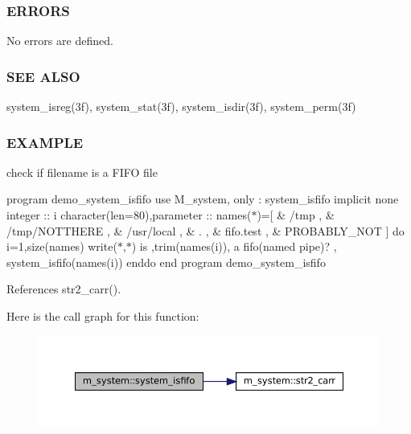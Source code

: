 \subsubsection*{E\+R\+R\+O\+RS}

No errors are defined.

\subsubsection*{S\+EE A\+L\+SO}

system\+\_\+isreg(3f), system\+\_\+stat(3f), system\+\_\+isdir(3f), system\+\_\+perm(3f)

\subsubsection*{E\+X\+A\+M\+P\+LE}

check if filename is a F\+I\+FO file

program demo\+\_\+system\+\_\+isfifo use M\+\_\+system, only \+: system\+\_\+isfifo implicit none integer \+:\+: i character(len=80),parameter \+:\+: names($\ast$)=\mbox{[} \& \textquotesingle{}/tmp \textquotesingle{}, \& \textquotesingle{}/tmp/\+N\+O\+T\+T\+H\+E\+RE \textquotesingle{}, \& \textquotesingle{}/usr/local \textquotesingle{}, \& \textquotesingle{}. \textquotesingle{}, \& \textquotesingle{}fifo.\+test \textquotesingle{}, \& \textquotesingle{}P\+R\+O\+B\+A\+B\+L\+Y\+\_\+\+N\+OT \textquotesingle{}\mbox{]} do i=1,size(names) write($\ast$,$\ast$)\textquotesingle{} is \textquotesingle{},trim(names(i)),\textquotesingle{} a fifo(named pipe)? \textquotesingle{}, system\+\_\+isfifo(names(i)) enddo end program demo\+\_\+system\+\_\+isfifo 

References str2\+\_\+carr().

Here is the call graph for this function\+:\nopagebreak
\begin{figure}[H]
\begin{center}
\leavevmode
\includegraphics[width=350pt]{namespacem__system_aa2bdb5f75405d87934c10756b539d082_cgraph}
\end{center}
\end{figure}
\mbox{\label{namespacem__system_a268d0cd27be36527894fe2cae0f1b9f6}} 
